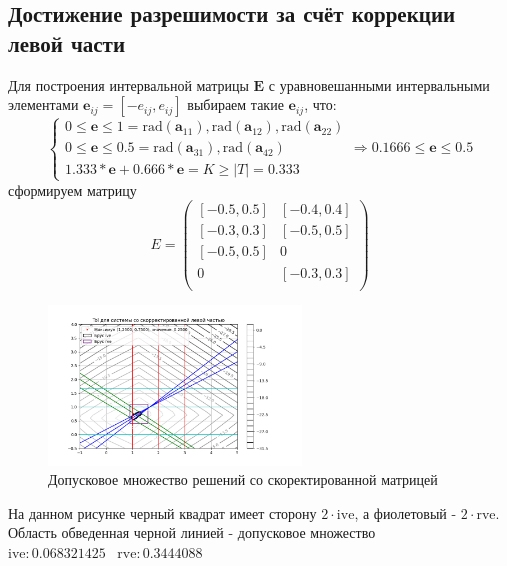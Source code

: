\documentclass[a4paper,14pt]{article}
\begin{document}
	\subsection{Достижение разрешимости за счёт коррекции левой части}
	Для построения интервальной матрицы $\textbf{E}$ с уравновешанными интервальными элементами $\mathbf{e}_{ij}=[-e_{ij}, e_{ij}]$ выбираем такие $\mathbf{e}_{ij}$, что:
	\begin{equation*}
		\begin{cases}
			0 \leq \mathbf{e} \leq 1 = \mathrm{rad}(\textbf{a}_{11}), \mathrm{rad}(\textbf{a}_{12}), \mathrm{rad}(\textbf{a}_{22}) \\
			0 \leq \mathbf{e} \leq 0.5 = \mathrm{rad}(\textbf{a}_{31}), \mathrm{rad}(\textbf{a}_{42}) \\
			1.333*\mathbf{e} + 0.666*\mathbf{e} = K \geq |T| = 0.333
		\end{cases}
		\Rightarrow 0.1666 \leq \mathbf{e} \leq 0.5
	\end{equation*}
	сформируем матрицу 
	\begin{equation}
		{E}=
		\begin{pmatrix}
			[-0.5, 0.5] & [-0.4, 0.4] \\
			[-0.3, 0.3] & [-0.5, 0.5] \\
			[-0.5, 0.5] & 0 \\
			0 & [-0.3, 0.3] \\
		\end{pmatrix}
	\end{equation}
	\begin{figure}[H]
		\centering
		\includegraphics[width=0.6\textwidth]{../src/pic/left.png}
		\caption{Допусковое множество решений со скоректированной матрицей} 
		\label{fig:MatrixCorrSet}
	\end{figure}
	\noindent На данном рисунке черный квадрат имеет сторону $2\cdot \mathrm{ive}$, а фиолетовый - $2\cdot \mathrm{rve}. $ Область обведенная черной линией - допусковое множество\\
	$\mathrm{ive}: 0.068321425 \;\;\;\mathrm{rve}: 0.3444088$
\end{document}
